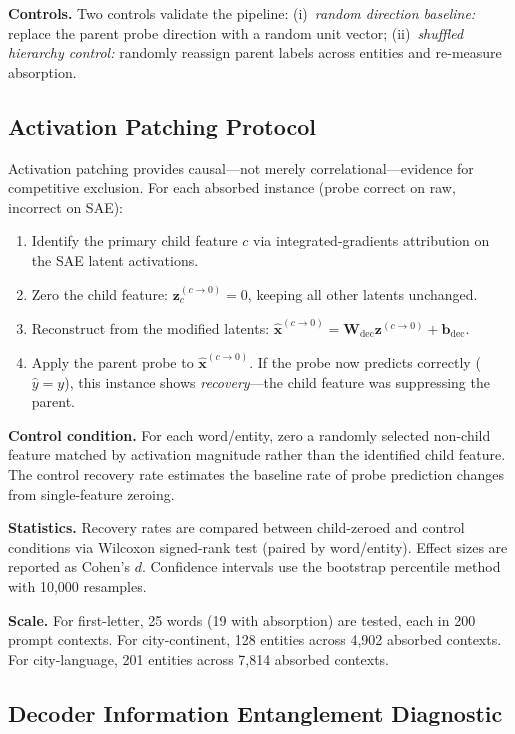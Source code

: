\documentclass{article}
\begin{document}
\textbf{Controls.} Two controls validate the pipeline: (i)~\emph{random direction baseline:} replace the parent probe direction with a random unit vector; (ii)~\emph{shuffled hierarchy control:} randomly reassign parent labels across entities and re-measure absorption.

\subsection{Activation Patching Protocol}

Activation patching provides causal---not merely correlational---evidence for competitive exclusion. For each absorbed instance (probe correct on raw, incorrect on SAE):

\begin{enumerate}
\item Identify the primary child feature $c$ via integrated-gradients attribution on the SAE latent activations.
\item Zero the child feature: $\mathbf{z}^{(c \to 0)}_c = 0$, keeping all other latents unchanged.
\item Reconstruct from the modified latents: $\hat{\mathbf{x}}^{(c \to 0)} = \mathbf{W}_{\text{dec}} \mathbf{z}^{(c \to 0)} + \mathbf{b}_{\text{dec}}$.
\item Apply the parent probe to $\hat{\mathbf{x}}^{(c \to 0)}$. If the probe now predicts correctly ($\hat{y} = y$), this instance shows \emph{recovery}---the child feature was suppressing the parent.
\end{enumerate}

\textbf{Control condition.} For each word/entity, zero a randomly selected non-child feature matched by activation magnitude rather than the identified child feature. The control recovery rate estimates the baseline rate of probe prediction changes from single-feature zeroing.

\textbf{Statistics.} Recovery rates are compared between child-zeroed and control conditions via Wilcoxon signed-rank test (paired by word/entity). Effect sizes are reported as Cohen's $d$. Confidence intervals use the bootstrap percentile method with 10,000 resamples.

\textbf{Scale.} For first-letter, 25 words (19 with absorption) are tested, each in 200 prompt contexts. For city-continent, 128 entities across 4,902 absorbed contexts. For city-language, 201 entities across 7,814 absorbed contexts.

\subsection{Decoder Information Entanglement Diagnostic}
\end{document}
